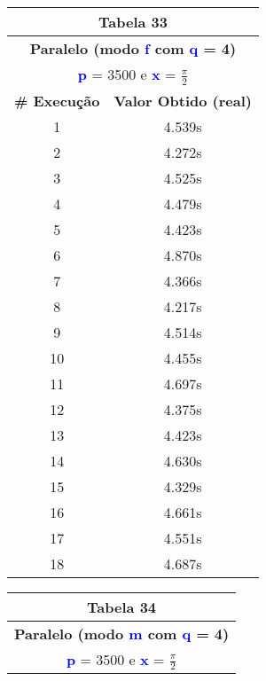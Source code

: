 \documentclass[11pt]{article}
\begin{document}
\begin{table}[!h]
	\begin{center}
		\begin{minipage}{0.48\textwidth}
			\begin{tabular}{| c | c |}
			\hline
			\multicolumn{2}{|c|}{\textbf{Tabela 33}} \\ \hline
			\multicolumn{2}{|c|}{\textbf{Paralelo (modo \textbf{\textcolor{blue}{f}} com \textbf{\textcolor{blue}{q}} = 4)}} \\
			\multicolumn{2}{|c|}{\textbf{\textcolor{blue}{p}} = 3500 e \textbf{\textcolor{blue}{x}} = $\frac{\pi}{2}$} \\ [0.2ex]
			\hline
				\textbf{\# Execução} &  \textbf{Valor Obtido (real)} \\ \hline
				1 & 4.539s \\ \hline
				2 & 4.272s \\ \hline
				3 & 4.525s \\ \hline
				4 & 4.479s \\ \hline
				5 & 4.423s \\ \hline
				6 & 4.870s \\ \hline
				7 & 4.366s \\ \hline
				8 & 4.217s \\ \hline
				9 & 4.514s \\ \hline
				10 & 4.455s \\ \hline
				11 & 4.697s \\ \hline
				12 & 4.375s \\ \hline
				13 & 4.423s \\ \hline
				14 & 4.630s \\ \hline
				15 & 4.329s \\ \hline
				16 & 4.661s \\ \hline
				17 & 4.551s \\ \hline
				18 & 4.687s \\ \hline
			\end{tabular}
		\end{minipage}
		\begin{minipage}{0.48\textwidth}
			\begin{tabular}{| c | c |}
			\hline
			\multicolumn{2}{|c|}{\textbf{Tabela 34}} \\ \hline
			\multicolumn{2}{|c|}{\textbf{Paralelo (modo \textbf{\textcolor{blue}{m}} com \textbf{\textcolor{blue}{q}} = 4)}} \\
			\multicolumn{2}{|c|}{\textbf{\textcolor{blue}{p}} = 3500 e \textbf{\textcolor{blue}{x}} = $\frac{\pi}{2}$} \\ [0.2ex]

\end{tabular}
\end{minipage}
\end{center}
\end{table}
\end{document}
